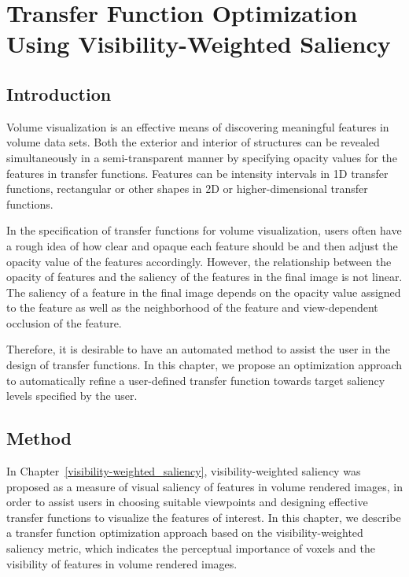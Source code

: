 \chapter{Transfer Function Optimization Using Visibility-Weighted Saliency}

\section{Introduction}
Volume visualization is an effective means of discovering meaningful features in volume data sets.
Both the exterior and interior of structures can be revealed simultaneously in a semi-transparent manner by specifying opacity values for the features in transfer functions.
Features can be intensity intervals in 1D transfer functions, rectangular or other shapes in 2D or higher-dimensional transfer functions.

In the specification of transfer functions for volume visualization, users often have a rough idea of how clear and opaque each feature should be and then adjust the opacity value of the features accordingly.
However, the relationship between the opacity of features and the saliency of the features in the final image is not linear.
The saliency of a feature in the final image depends on the opacity value assigned to the feature as well as the neighborhood of the feature and view-dependent occlusion of the feature.

Therefore, it is desirable to have an automated method to assist the user in the design of transfer functions. In this chapter, we propose an optimization approach to automatically refine a user-defined transfer function towards target saliency levels specified by the user.

\section{Method}
In Chapter~\ref{visibility-weighted_saliency}, visibility-weighted saliency was proposed as a measure of visual saliency of features in volume rendered images, in order to assist users in choosing suitable viewpoints and designing effective transfer functions to visualize the features of interest. In this chapter, we describe a transfer function optimization approach based on the visibility-weighted saliency metric, which indicates the perceptual importance of voxels and the visibility of features in volume rendered images.

